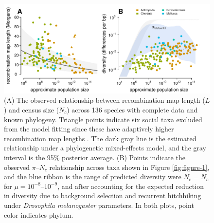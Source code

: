 \documentclass[11pt]{article}
\begin{document}
\begin{figure}[t!]
  \centering
  \includegraphics[width=\textwidth]{figures/figure_3.pdf}

  \caption{(A) The observed relationship between recombination map length ($L$)
    and census size ($N_c$) across 136 species with complete data and known
    phylogeny. Triangle points indicate six social taxa excluded from the model
    fitting since these have adaptively higher recombination map lengths
    \parencite{Wilfert2007-dx}. The dark gray line is the estimated
    relationship under a phylogenetic mixed-effects model, and the gray
    interval is the 95\% posterior average. (B) Points indicate the observed
    $\pi$--$N_c$ relationship across taxa shown in Figure \ref{fig:figure-1},
    and the blue ribbon is the range of predicted diversity were $N_e = N_c$
    for $\mu = 10^{-8}$--$10^{-9}$,  and after accounting for the expected
  reduction in diversity due to background selection and recurrent hitchhiking
under \emph{Drosophila melanogaster} parameters. In both plots, point color
indicates phylum.}

  \label{fig:figure-3}
\end{figure}
\end{document}
